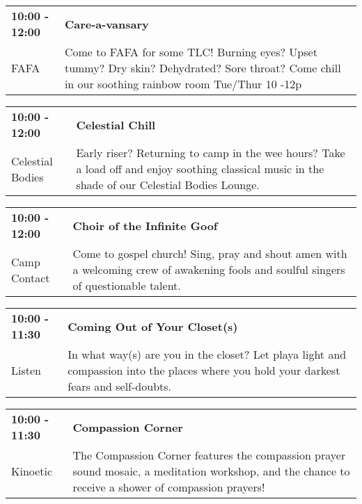 \begin{tabular}{ p{1in} p{2.2in} }
    \textbf{10:00 - 12:00} & \textbf{Care-a-vansary} \\
    FAFA \newline  & Come to FAFA for some TLC!  Burning eyes?  Upset tummy? Dry skin?  Dehydrated?  Sore throat?  Come chill in our soothing rainbow room Tue/Thur 10 -12p \\
    \hline 
\end{tabular}
    
\begin{tabular}{ p{1in} p{2.2in} }
    \textbf{10:00 - 12:00} & \textbf{Celestial Chill} \\
    Celestial Bodies \newline  & Early riser? Returning to camp in the wee hours? Take a load off and enjoy soothing classical music in the shade of our Celestial Bodies Lounge. \\
    \hline 
\end{tabular}
    
\begin{tabular}{ p{1in} p{2.2in} }
    \textbf{10:00 - 12:00} & \textbf{Choir of the Infinite Goof} \\
    Camp Contact \newline  & Come to gospel church! Sing, pray and shout amen with a welcoming crew of awakening fools and soulful singers of questionable talent. \\
    \hline 
\end{tabular}
    
\begin{tabular}{ p{1in} p{2.2in} }
    \textbf{10:00 - 11:30} & \textbf{Coming Out of Your Closet(s)} \\
    Listen \newline  & In what way(s) are you in the closet? Let playa light and compassion into the places where you hold your darkest fears and self-doubts. \\
    \hline 
\end{tabular}
    
\begin{tabular}{ p{1in} p{2.2in} }
    \textbf{10:00 - 11:30} & \textbf{Compassion Corner} \\
    Kinoetic \newline  & The Compassion Corner features the compassion prayer sound mosaic, a meditation workshop, and the chance to receive a shower of compassion prayers! \\
    \hline 
\end{tabular}
    
